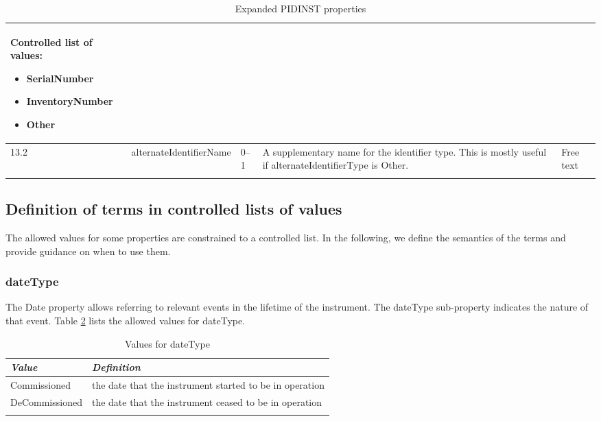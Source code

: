\documentclass[titlepage=true,twoside=false,DIV=13]{scrartcl}
\begin{document}
\begin{longtable}{|l|l|l|p{}|p{\valcolw}|}
\begin{minipage}[t]{\valcolw}
            Controlled list of values:
            \begin{itemize}[nosep,leftmargin=3.5ex]
            \item SerialNumber
            \item InventoryNumber
            \item Other
            \end{itemize}
            \vspace{1ex}
          \end{minipage} \\
  \hline
  13.2  & alternateIdentifierName      & 0--1
        & A supplementary name for the identifier type.  This is
          mostly useful if alternateIdentifierType is Other.
        & Free text \\
  \hline
  \caption{Expanded PIDINST properties}
  \label{tab:schema:expandprops}
\end{longtable}

\subsection{Definition of terms in controlled lists of values}

The allowed values for some properties are constrained to a controlled
list.  In the following, we define the semantics of the terms and
provide guidance on when to use them.

\newlength{\valnamecolw}\settowidth{\valnamecolw}{IsPreviousVersionOf}
\newlength{\valdefcolw}
\setlength{\valdefcolw}{\textwidth}
\addtolength{\valdefcolw}{-\valnamecolw}
\addtolength{\valdefcolw}{-4\tabcolsep}

\subsubsection{dateType}

The Date property allows referring to relevant events in the lifetime
of the instrument.  The dateType sub-property indicates the nature of
that event.  Table \ref{tab:schema:values:dateType} lists the allowed
values for dateType.

\begin{longtable}{|l|l|}
  \hline
  \emph{Value} & \emph{Definition} \\
  \hline \endhead
  \hline \endfoot\endlastfoot
  Commissioned   & the date that the instrument started to be in operation \\
  DeCommissioned & the date that the instrument ceased to be in operation \\
  \hline
  \caption{Values for dateType}
  \label{tab:schema:values:dateType}
\end{longtable}
\end{document}
